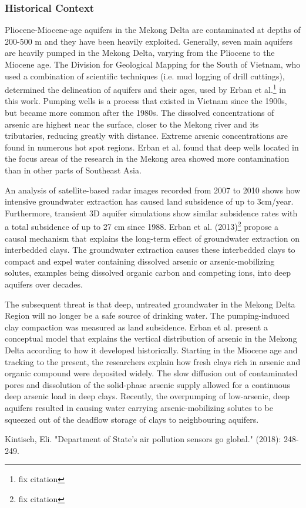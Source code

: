 \subsubsection{Historical Context}

Pliocene-Miocene-age aquifers in the Mekong Delta are contaminated at depths of 200-500 m and they have been heavily exploited. Generally, seven main aquifers are heavily pumped in the Mekong Delta, varying from the Pliocene to the Miocene age. The Division for Geological Mapping for the South of Vietnam, who used a combination of scientific techniques  (i.e. mud logging of drill cuttings), determined the delineation of aquifers and their ages, used by Erban et al.\footnote{fix citation} in this work. Pumping wells is a process that existed in Vietnam since the 1900s, but became more common after the 1980s. The dissolved concentrations of arsenic are highest near the surface, closer to the Mekong river and its tributaries, reducing greatly with distance. Extreme arsenic concentrations are found in numerous hot spot regions. Erban et al. found that deep wells located in the focus areas of the research in the Mekong area showed more contamination than in other parts of Southeast Asia.
  
An analysis of satellite-based radar images recorded from 2007 to 2010 shows how intensive groundwater extraction has caused land subsidence of up to 3cm/year. Furthermore, transient 3D aquifer simulations show similar subsidence rates with a total subsidence of up to 27 cm since 1988.  Erban et al. (2013)\footnote{fix citation} propose a causal mechanism that explains the long-term effect of groundwater extraction on interbedded clays. The groundwater extraction causes these interbedded clays to compact and expel water containing dissolved arsenic or arsenic-mobilizing solutes, examples being dissolved organic carbon and competing ions, into deep aquifers over decades.
  
The subsequent threat is that deep, untreated groundwater in the Mekong Delta Region will no longer be a safe source of drinking water. The pumping-induced clay compaction was measured as land subsidence. Erban et al. present a conceptual model that explains the vertical distribution of arsenic in the Mekong Delta according to how it developed historically. Starting in the Miocene age and tracking to the present, the researchers explain how fresh clays rich in arsenic and organic compound were deposited widely. The slow diffusion out of contaminated pores and dissolution of the solid-phase arsenic supply allowed for a continuous deep arsenic load in deep clays. Recently, the overpumping of low-arsenic, deep aquifers resulted in causing water carrying arsenic-mobilizing solutes to be squeezed out of the deadflow storage of clays to neighbouring aquifers. 


Kintisch, Eli. "Department of State's air pollution sensors go global." (2018): 248-249.